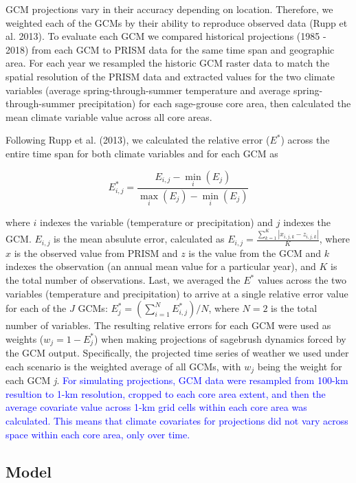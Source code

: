 \documentclass[
  12pt,
]{article}
\begin{document}
GCM projections vary in their accuracy depending on location.
Therefore, we weighted each of the GCMs by their ability to reproduce observed data (Rupp et al. 2013).
To evaluate each GCM we compared historical projections (1985 - 2018) from each GCM to PRISM data for the same time span and geographic area.
For each year we resampled the historic GCM raster data to match the spatial resolution of the PRISM data and extracted values for the two climate variables (average spring-through-summer temperature and average spring-through-summer precipitation) for each sage-grouse core area, then calculated the mean climate variable value across all core areas.

Following Rupp et al. (2013), we calculated the relative error (\(E^*\)) across the entire time span for both climate variables and for each GCM as

\begin{equation}
E_{i,j}^* = \frac{E_{i,j} - \min\limits_{i}(E_{j})}{\max\limits_{i}(E_{j}) - \min\limits_i(E_{j})}
\end{equation}

\noindent{}where \(i\) indexes the variable (temperature or precipitation) and \(j\) indexes the GCM.
\(E_{i,j}\) is the mean absulute error, calculated as \(E_{i,j} = \frac{\sum_{k=1}^K|x_{i,j,k} - z_{i,j,k}|}{K}\), where \(x\) is the observed value from PRISM and \(z\) is the value from the GCM and \(k\) indexes the observation (an annual mean value for a particular year), and \(K\) is the total number of observations.
Last, we averaged the \(E^*\) values across the two variables (temperature and precipitation) to arrive at a single relative error value for each of the \(J\) GCMs: \(E_{j}^* = \left(\sum_{i=1}^N E_{i,j}^* \right) / N\), where \(N = 2\) is the total number of variables.
The resulting relative errors for each GCM were used as weights (\(w_j = 1 - E_j^*\)) when making projections of sagebrush dynamics forced by the GCM output.
Specifically, the projected time series of weather we used under each scenario is the weighted average of all GCMs, with \(w_j\) being the weight for each GCM \emph{j}.
\textcolor{blue}{For simulating projections, GCM data were resampled from 100-km resultion to 1-km resolution, cropped to each core area extent, and then the average covariate value across 1-km grid cells within each core area was calculated.}
\textcolor{blue}{This means that climate covariates for projections did not vary across space within each core area, only over time.}

\hypertarget{model}{%
\subsection{Model}\label{model}}
\end{document}
